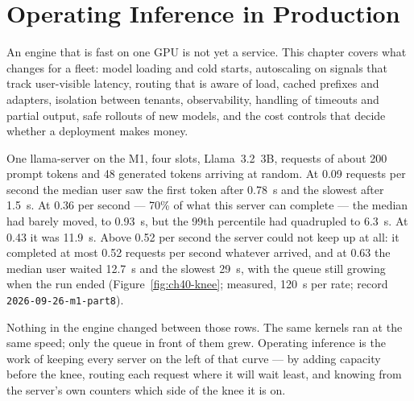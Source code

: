 \chapter{Operating Inference in Production}\label{ch:production}

\begin{ChapterIntent}
An engine that is fast on one GPU is not yet a service. This chapter
covers what changes for a fleet: model loading and cold starts, autoscaling
on signals that track user-visible latency, routing that is aware of load,
cached prefixes and adapters, isolation between tenants, observability,
handling of timeouts and partial output, safe rollouts of new models, and the
cost controls that decide whether a deployment makes money.
\end{ChapterIntent}


One llama-server on the M1, four slots, Llama~3.2~3B, requests of about 200
prompt tokens and 48 generated tokens arriving at random. At 0.09 requests per
second the median user saw the first token after 0.78~s and the slowest after
1.5~s. At 0.36 per second --- 70\% of what this server can complete --- the
median had barely moved, to 0.93~s, but the 99th percentile had quadrupled to
6.3~s. At 0.43 it was 11.9~s. Above 0.52 per second the server could not keep
up at all: it completed at most 0.52 requests per second whatever arrived, and
at 0.63 the median user waited 12.7~s and the slowest 29~s, with the queue
still growing when the run ended (Figure~\ref{fig:ch40-knee}; measured, 120~s
per rate; record \texttt{2026-09-26-m1-part8}).

Nothing in the engine changed between those rows. The same kernels ran at the
same speed; only the queue in front of them grew. Operating inference is the
work of keeping every server on the left of that curve --- by adding capacity
before the knee, routing each request where it will wait least, and knowing
from the server's own counters which side of the knee it is on.


